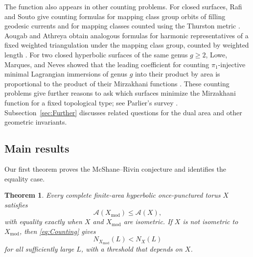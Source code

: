 \documentclass[10pt,twoside]{article}
\theoremstyle{plain}
\newtheorem{theorem}{Theorem}[section]
\theoremstyle{definition}
\theoremstyle{remark}
\newcommand{\A}{\mathcal A}
\newcommand{\Xmod}{X_{\mathrm{mod}}}
\begin{document}
The function also appears in other counting problems.
For closed surfaces, Rafi and Souto give counting formulas for
mapping class group orbits of filling geodesic currents and for
mapping classes counted using the Thurston metric
\cite{RafiSouto}.
Aougab and Athreya obtain analogous formulas for harmonic
representatives of a fixed weighted triangulation under the
mapping class group, counted by weighted length
\cite[Theorem~1.2]{AougabAthreya}.
For two closed hyperbolic surfaces of the same genus $g\geq2$,
Lowe, Marques, and Neves showed that the leading coefficient
for counting $\pi_1$-injective minimal Lagrangian immersions
of genus $g$ into their product by area is proportional
to the product of their Mirzakhani functions
\cite[Corollary~1.5]{LoweMarquesNeves}. These counting problems give
further reasons to ask which surfaces minimize the Mirzakhani
function for a fixed topological type; see Parlier's survey
\cite{ParlierSurvey}. Subsection~\ref{sec:Further} discusses related
questions for the dual area and other geometric invariants.

\subsection{Main results}
Our first theorem proves the McShane--Rivin conjecture and identifies
the equality case.

\begin{theorem}
\label{thm:global-area}
Every complete finite-area hyperbolic once-punctured torus $X$ satisfies
$$
\A(\Xmod) \le \A(X),
$$
with equality exactly when $X$ and $\Xmod$ are isometric.
If $X$ is not isometric to $\Xmod$, then \eqref{eq:Counting} gives
$$
N_{\Xmod}(L)<N_X(L)
$$
for all sufficiently large $L$, with a threshold that depends on $X$.
\end{theorem}
\end{document}
